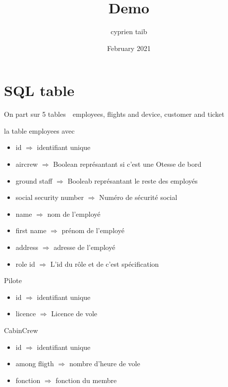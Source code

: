 \documentclass{article}
\title{Demo}
\author{cyprien taib}
\date{February 2021}
\begin{document}
    \maketitle

    \section{SQL table}
        On part sur 5 tables 
           \,\, employees, flights and device, customer and ticket

        la table employees avec 
        
            \begin{itemize}
                \centering
                \item id $\Rightarrow$ identifiant unique 
                \item aircrew $\Rightarrow$ Boolean représantant si c'est une Otesse de bord
                \item ground staff $\Rightarrow$ Booleab représantant le reste des employés
                \item social security number $\Rightarrow$ Numéro de sécurité social
                \item name $\Rightarrow$ nom de l'employé 
                \item first name $\Rightarrow$ prénom de l'employé
                \item address $\Rightarrow$ adresse de l'employé
                \item role id $\Rightarrow$ L'id du rôle et de c'est spécification
            \end{itemize}
        
        Pilote 
            \begin{itemize}
                \centering
                \item id $\Rightarrow$ identifiant unique 
                \item licence $\Rightarrow$ Licence de vole 
            \end{itemize}
        
        CabinCrew 
            \begin{itemize}
                \centering
                \item id $\Rightarrow$ identifiant unique
                \item among fligth $\Rightarrow$ nombre d'heure de vole
                \item fonction $\Rightarrow$ fonction du membre
            \end{itemize}
                
\end{document}
